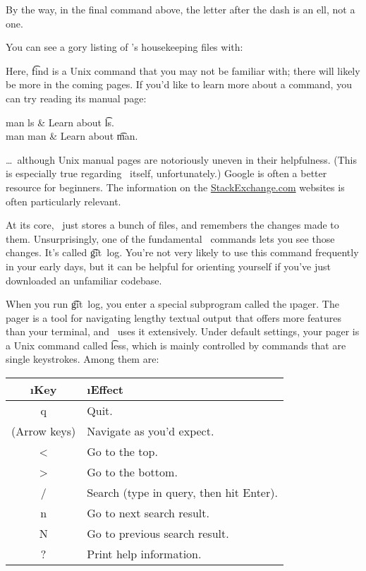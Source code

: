 \documentclass[letterpaper,12pt,titlepage,twoside]{article}
\begin{document}
By the way, in the final command above, the letter after the dash is an ell,
not a one.


You can see a gory listing of \git's housekeeping files with:


Here, \t{find} is a Unix command that you may not be familiar with; there will
likely be more in the coming pages. If you'd like to learn more about a
command, you can try reading its manual page:

\begin{typeme}
man ls & Learn about \t{ls}. \\
man man & Learn about \t{man}.
\end{typeme}

\ldots\ although Unix manual pages are notoriously uneven in their
helpfulness. (This is especially true regarding \git\ itself, unfortunately.)
Google is often a better resource for beginners. The information on the
\href{http://stackexchange.com/}{StackExchange.com} websites is often
particularly relevant.



At its core, \git\ just stores a bunch of files, and remembers the changes
made to them. Unsurprisingly, one of the fundamental \git\ commands lets you
see those changes. It's called \t{git~log}. You're not very likely to use this
command frequently in your early days, but it can be helpful for orienting
yourself if you've just downloaded an unfamiliar codebase.


When you run \t{git~log}, you enter a special subprogram called the \i{pager}.
The pager is a tool for navigating lengthy textual output that offers more
features than your terminal, and \git\ uses it extensively. Under default
settings, your pager is a Unix command called \t{less}, which is mainly
controlled by commands that are single keystrokes. Among them are:

\begin{center}
\begin{tabular}{>{\ttfamily}cl}
\rmfamily\i{Key} & \i{Effect} \\ \hline
q & Quit. \\
\rmfamily(Arrow keys) & Navigate as you'd expect. \\
< & Go to the top. \\
> & Go to the bottom. \\
/ & Search (type in query, then hit Enter). \\
n & Go to next search result. \\
N & Go to previous search result. \\
? & Print help information.
\end{tabular}
\end{center}
\end{document}
